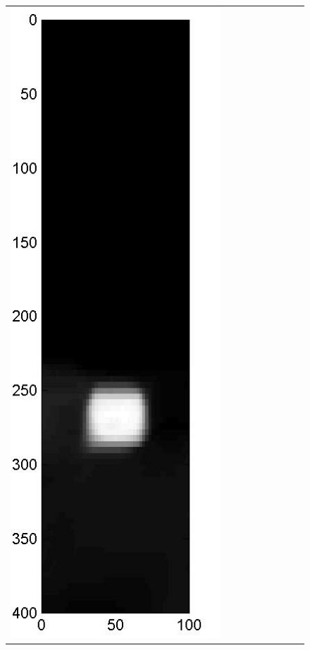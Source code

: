 \documentclass[english]{siamltex}
\begin{document}
{\begin{figure}[!h]
\begin{center}
\begin{tabular}{|c|c|c|c|c|c|c|c|c|}
			\includegraphics[width=.9\iwidth]{figures/newFigs/noisy/resultsExp-6-mkTV}
			&

\end{tabular}
\end{center}
\end{figure}}
\end{document}
